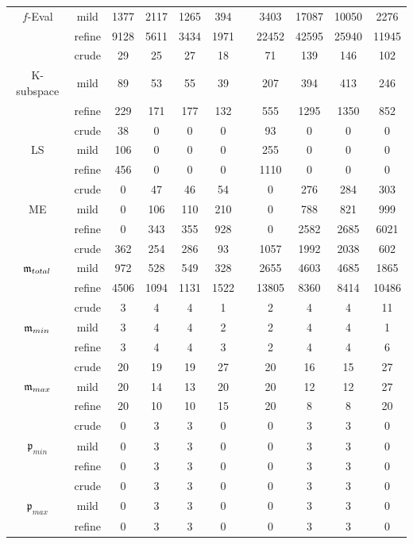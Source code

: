 \begin{table}
\begin{adjustbox}{width=0.98\columnwidth,center}
\begin{tabular}{ccccccccccc}
            $f$-Eval & mild & 1377 & 2117 & 1265 & 394 &  & 3403 & 17087 & 10050 & 2276 \\
            & refine & 9128 & 5611 & 3434 & 1971 &  & 22452 & 42595 & 25940 & 11945 \\
            \hline
            & crude & 29 & 25 & 27 & 18 &  & 71 & 139 & 146 & 102 \\
            K-subspace & mild & 89 & 53 & 55 & 39 &  & 207 & 394 & 413 & 246 \\
            & refine & 229 & 171 & 177 & 132 &  & 555 & 1295 & 1350 & 852 \\
            \hline
            & crude & 38 & 0 & 0 & 0 &  & 93 & 0 & 0 & 0 \\
            LS & mild & 106 & 0 & 0 & 0 &  & 255 & 0 & 0 & 0 \\
            & refine & 456 & 0 & 0 & 0 &  & 1110 & 0 & 0 & 0 \\
            \hline
            & crude & 0 & 47 & 46 & 54 &  & 0 & 276 & 284 & 303 \\
            ME & mild & 0 & 106 & 110 & 210 &  & 0 & 788 & 821 & 999 \\
            & refine & 0 & 343 & 355 & 928 &  & 0 & 2582 & 2685 & 6021 \\
            \hline
            & crude & 362 & 254 & 286 & 93 &  & 1057 & 1992 & 2038 & 602 \\
            $\mathfrak{m}_{total}$ & mild & 972 & 528 & 549 & 328 &  & 2655 & 4603 & 4685 & 1865 \\
            & refine & 4506 & 1094 & 1131 & 1522 &  & 13805 & 8360 & 8414 & 10486 \\
            \hline
            & crude & 3 & 4 & 4 & 1 &  & 2 & 4 & 4 & 11 \\
            $\mathfrak{m}_{min}$ & mild & 3 & 4 & 4 & 2 &  & 2 & 4 & 4 & 1 \\
            & refine & 3 & 4 & 4 & 3 &  & 2 & 4 & 4 & 6 \\
            \hline
            & crude & 20 & 19 & 19 & 27 &  & 20 & 16 & 15 & 27 \\
            $\mathfrak{m}_{max}$ & mild & 20 & 14 & 13 & 20 &  & 20 & 12 & 12 & 27 \\
            & refine & 20 & 10 & 10 & 15 &  & 20 & 8 & 8 & 20 \\
            \hline
            & crude & 0 & 3 & 3 & 0 &  & 0 & 3 & 3 & 0 \\
            $\mathfrak{p}_{min}$ & mild & 0 & 3 & 3 & 0 &  & 0 & 3 & 3 & 0 \\
            & refine & 0 & 3 & 3 & 0 &  & 0 & 3 & 3 & 0 \\
            \hline
            & crude & 0 & 3 & 3 & 0 &  & 0 & 3 & 3 & 0 \\
            $\mathfrak{p}_{max}$ & mild & 0 & 3 & 3 & 0 &  & 0 & 3 & 3 & 0 \\
            & refine & 0 & 3 & 3 & 0 &  & 0 & 3 & 3 & 0 \\
            \hline
        \end{tabular}
    \end{adjustbox}
\end{table}


